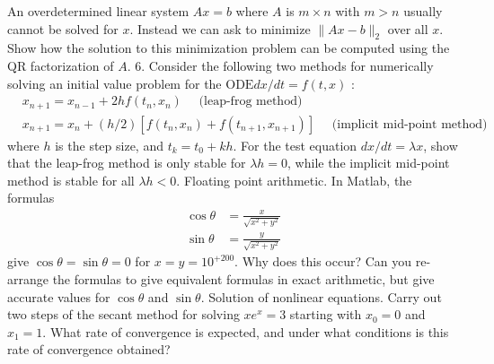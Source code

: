 \documentclass[14pt]{extarticle}
\begin{document}
An overdetermined linear system $A x=b$ where $A$ is $m \times n$ with $m>n$ usually cannot be solved for $x$. Instead we can ask to minimize $\|A x-b\|_{2}$ over all $x$. Show how the solution to this minimization problem can be computed using the QR factorization of $A$.
\newpage
6. Consider the following two methods for numerically solving an initial value problem for the $\mathrm{ODE} d x / d t=f(t, x)$ :
$$
\begin{aligned}
&x_{n+1}=x_{n-1}+2 h f\left(t_{n}, x_{n}\right) \quad \text { (leap-frog method) } \\
&x_{n+1}=x_{n}+(h / 2)\left[f\left(t_{n}, x_{n}\right)+f\left(t_{n+1}, x_{n+1}\right)\right] \quad \text { (implicit mid-point method) }
\end{aligned}
$$
where $h$ is the step size, and $t_{k}=t_{0}+k h$. For the test equation $d x / d t=\lambda x$, show that the leap-frog method is only stable for $\lambda h=0$, while the implicit mid-point method is stable for all $\lambda h<0$.
\newpage
Floating point arithmetic. In Matlab, the formulas
$$
\begin{aligned}
\cos \theta &=\frac{x}{\sqrt{x^{2}+y^{2}}} \\
\sin \theta &=\frac{y}{\sqrt{x^{2}+y^{2}}}
\end{aligned}
$$
give $\cos \theta=\sin \theta=0$ for $x=y=10^{+200}$. Why does this occur? Can you re-arrange the formulas to give equivalent formulas in exact arithmetic, but give accurate values for $\cos \theta$ and $\sin \theta$.
\newpage
Solution of nonlinear equations. Carry out two steps of the secant method for solving $x e^{x}=3$ starting with $x_{0}=0$ and $x_{1}=1$. What rate of convergence is expected, and under what conditions is this rate of convergence obtained?
\end{document}
